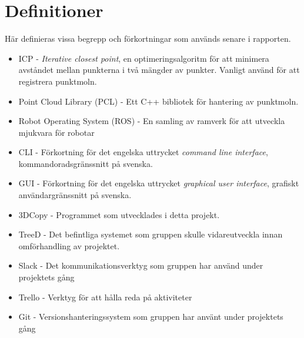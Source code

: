 \section{Definitioner}
\label{sec:definitions}
Här definieras vissa begrepp och förkortningar som används senare i rapporten.

\begin{itemize}
	\item ICP - \textit{Iterative closest point}, en optimeringsalgoritm för att minimera avståndet mellan punkterna i två mängder av punkter. Vanligt använd för att registrera punktmoln.
	\item Point Cloud Library (PCL) - Ett C++ bibliotek för hantering av punktmoln.
	\item Robot Operating System (ROS) - En samling av ramverk för att utveckla mjukvara för robotar
	\item CLI - Förkortning för det engelska uttrycket \textit{command line interface}, kommandoradsgränssnitt på svenska.
	\item GUI - Förkortning för det engelska uttrycket \textit{graphical user interface}, grafiskt användargränssnitt på svenska.
	\item 3DCopy - Programmet som utvecklades i detta projekt.
	\item TreeD - Det befintliga systemet som gruppen skulle vidareutveckla innan omförhandling av projektet.
	\item Slack - Det kommunikationsverktyg som gruppen har använd under projektets gång
	\item Trello - Verktyg för att hålla reda på aktiviteter
	\item Git - Versionshanteringssystem som gruppen har använt under projektets gång
\end{itemize} 


